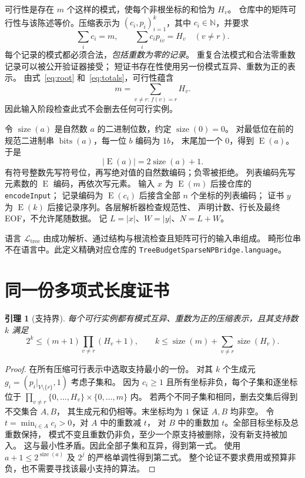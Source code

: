 \documentclass[UTF8,11pt]{ctexart}
\newtheorem{lemma}[theorem]{引理}
\newcommand{\bits}{\operatorname{bits}}
\newcommand{\size}{\operatorname{size}}
\newcommand{\enc}{\operatorname{E}}
\newcommand{\Lang}{\mathcal L_{\mathrm{tree}}}
\begin{document}
可行性是存在 $m$ 个这样的模式，使每个非根坐标的和恰为 $H_v$。
仓库中的矩阵可行性与该陈述等价。压缩表示为
$(c_i,p_i)_{i=1}^k$，其中 $c_i\in\mathbb N$，并要求
\begin{equation}\label{eq:totals}
 \sum_i c_i=m,\qquad
 \sum_i c_ip_{iv}=H_v\quad(v\ne r).
\end{equation}
每个记录的模式都必须合法，\emph{包括重数为零的记录}。
重复合法模式和合法零重数记录可以被公开验证器接受；
短证书存在性使用另一份模式互异、重数为正的表示。
由式~\eqref{eq:root} 和~\eqref{eq:totals}，可行性蕴含
\begin{equation}\label{eq:rootflow}
 m=\sum_{v\ne r:\,f(v)=r}H_v.
\end{equation}
因此输入阶段检查此式不会删去任何可行实例。

令 $\size(a)$ 是自然数 $a$ 的二进制位数，约定 $\size(0)=0$。
对最低位在前的规范二进制串 $\bits(a)$，每一位 $b$ 编码为 $1b$，
末尾加一个 $0$，得到 $\enc(a)$。于是
\[
 |\enc(a)|=2\size(a)+1.
\]
有符号整数先写符号位，再写绝对值的自然数编码；负零被拒绝。
列表编码先写元素数的 $\enc$ 编码，再依次写元素。
输入 $x$ 为 $\enc(m)$ 后接仓库的 \texttt{encodeInput}；
记录编码为 $\enc(c_i)$ 后接含全部 $n$ 个坐标的列表编码；
证书 $y$ 为 $\enc(k)$ 后接记录序列。各层解析器检查规范性、
声明计数、行长及最终 EOF，不允许尾随数据。
记 $L=|x|$、$W=|y|$、$N=L+W$。

语言 $\Lang$ 由成功解析、通过结构与根流检查且矩阵可行的输入串组成。
畸形位串不在语言中。此定义精确对应仓库的
\texttt{TreeBudgetSparseNPBridge.language}。

\section{同一份多项式长度证书}

\begin{lemma}[支持界]\label{lem:sparse}
每个可行实例都有模式互异、重数为正的压缩表示，且其支持数 $k$ 满足
\[
 2^k\le (m+1)\prod_{v\ne r}(H_v+1),\qquad
 k\le \size(m)+\sum_{v\ne r}\size(H_v).
\]
\end{lemma}
\begin{proof}
在所有压缩可行表示中选取支持最小的一份。
对其 $k$ 个生成元 $g_i=(p_i|_{V\setminus\{r\}},1)$ 考虑子集和。
因为 $c_i\ge1$ 且所有坐标非负，每个子集和逐坐标位于
$\prod_{v\ne r}\{0,\ldots,H_v\}\times\{0,\ldots,m\}$ 内。
若两个不同子集和相同，删去交集后得到不交集合 $A,B$，
其生成元和仍相等。末坐标均为 $1$ 保证 $A,B$ 均非空。
令 $t=\min_{i\in A}c_i>0$，对 $A$ 中的重数减 $t$，
对 $B$ 中的重数加 $t$。全部目标坐标及总重数保持，
模式不变且重数仍非负，至少一个原支持被删除，没有新支持被加入。
这与最小性矛盾。因此全部子集和互异，得到第一式。
使用 $a+1\le2^{\size(a)}$ 及 $2^j$ 的严格单调性得到第二式。
整个论证不要求费用或预算非负，也不需要寻找该最小支持的算法。
\end{proof}
\end{document}
